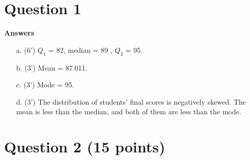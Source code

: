 \section*{Question 1 }



\textbf{Answers} 

\begin{itemize}
 \item[a.] (6') $Q_1$ = 82, median = 89 , $Q_3$ = 95.
 \item[b.] (3') Mean = 87.011.
 \item[c.] (3') Mode = 95.
 \item[d.] (3') The distribution of students' final scores is negatively skewed. The mean is less than the median, and both of them are less than the mode. 
 \end{itemize}
 

\section*{Question 2 (15 points)}

